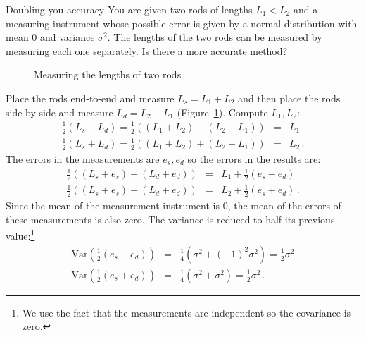 

\begin{prob}{Doubling you accuracy}
You are given two rods of lengths $L_1<L_2$ and a measuring instrument whose possible error is given by a normal distribution with mean $0$ and variance $\sigma^2$. The lengths of the two rods can be measured by measuring each one separately. Is there a more accurate method?
\end{prob}

\solution{}

\begin{figure}[bt]
\begin{center}
\end{center}
\caption{Measuring the lengths of two rods}\label{f.rods}
\end{figure}
Place the rods end-to-end and measure $L_s=L_1+L_2$ and then place the rods side-by-side and measure $L_d=L_2-L_1$ (Figure~\ref{f.rods}). Compute $L_1,L_2$:
\begin{eqnarray*}
\textstyle\frac{1}{2}(L_s-L_d)=\frac{1}{2}((L_1+L_2)-(L_2-L_1))&=&L_1\\
\textstyle\frac{1}{2}(L_s+L_d)=\frac{1}{2}((L_1+L_2)+(L_2-L_1))&=&L_2\,.
\end{eqnarray*}
The errors in the measurements are $e_s, e_d$ so the errors in the results are:
\begin{eqnarray*}
\textstyle\frac{1}{2}((L_s+e_s)-(L_d+e_d))&=&L_1+\textstyle\frac{1}{2}(e_s-e_d)\\
\textstyle\frac{1}{2}((L_s+e_s)+(L_d+e_d))&=&L_2+\textstyle\frac{1}{2}(e_s+e_d)\,.
\end{eqnarray*}
Since the mean of the measurement instrument is $0$, the mean of the errors of these measurements is also zero. The variance is reduced to half its previous value:\footnote{We use the fact that the measurements are independent so the covariance is zero.}
\begin{eqnarray*}
\mathrm{Var}\left(\textstyle\frac{1}{2}\left(e_s-e_d\right)\right)&=&
  \textstyle\frac{1}{4}(\sigma^2+(-1)^2\sigma^2)=\frac{1}{2}\sigma^2\\
\mathrm{Var}\left(\textstyle\frac{1}{2}(e_s+e_d)\right)&=&
  \textstyle\frac{1}{4}( \sigma^2+\sigma^2)=\frac{1}{2}\sigma^2\,.
\end{eqnarray*}


